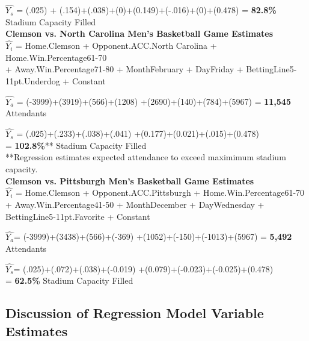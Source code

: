 \documentclass[preprint,12pt,times]{elsarticle}
\begin{document}
\noindent$\hat{Y_s}$ = (.025) + (.154)+(.038)+(0)+(0.149)+(-.016)+(0)+(0.478) =  \textbf{82.8\%} Stadium Capacity Filled\\

\newpage
\noindent\textbf{Clemson vs. North Carolina Men's Basketball Game Estimates}\\
\noindent
$\hat{Y_i}$ = Home.Clemson + Opponent.ACC.North Carolina + Home.Win.Percentage61-70 \\+ Away.Win.Percentage71-80 + MonthFebruary + DayFriday + BettingLine5-11pt.Underdog + Constant

\noindent$\hat{Y_a}$ = (-3999)+(3919)+(566)+(1208)
+(2690)+(140)+(784)+(5967) = \textbf{11,545} Attendants

\noindent$\hat{Y_s}$ = (.025)+(.233)+(.038)+(.041)
+(0.177)+(0.021)+(.015)+(0.478)\\  = \textbf{102.8\%}** Stadium Capacity Filled\\
**Regression estimates expected attendance to exceed maximimum stadium capacity.\\

\noindent\textbf{Clemson vs. Pittsburgh Men's Basketball Game Estimates}\\
\noindent
$\hat{Y_i}$ = Home.Clemson + Opponent.ACC.Pittsburgh + Home.Win.Percentage61-70\\ + Away.Win.Percentage41-50 + MonthDecember + DayWednesday + BettingLine5-11pt.Favorite + Constant

\noindent$\hat{Y_a}$= (-3999)+(3438)+(566)+(-369)
+(1052)+(-150)+(-1013)+(5967) = \textbf{5,492} Attendants

\noindent$\hat{Y_s}$= (.025)+(.072)+(.038)+(-0.019)
+(0.079)+(-0.023)+(-0.025)+(0.478)\\  = \textbf{62.5\%} Stadium Capacity Filled

\begin{large}
\subsection{\textbf{Discussion of Regression Model Variable Estimates}}
\end{large}
\end{document}
